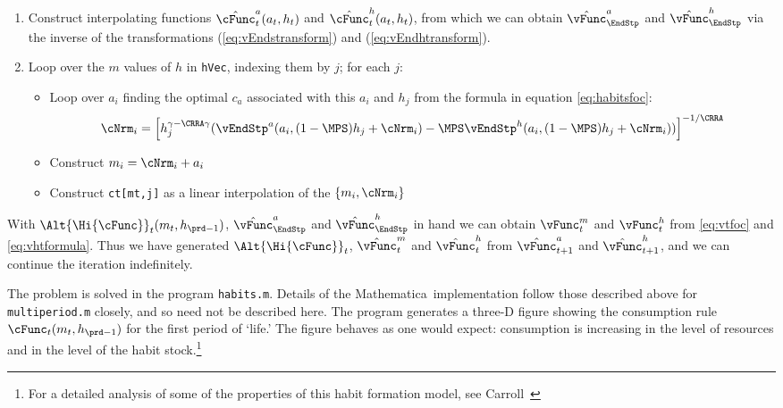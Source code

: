 \documentclass[\econtexRoot/SolvingMicroDSOPs]{subfiles}
\begin{document}
\begin{enumerate}
\item Construct interpolating functions $\hat{\cFunc}^{a}_{t}(a_{t},h_{t})$
  and $\hat{\cFunc }^{h}_{t}(a_{t},h_{t})$, from which we can
  obtain $\hat{\vFunc}_{\EndStp}^{a}$ and $\hat{\vFunc}_{\EndStp}^{h}$
  via the inverse of the transformations (\ref{eq:vEndstransform})
  and (\ref{eq:vEndhtransform}).

\item Loop over the $m$ values of $h$ in \texttt{hVec}, indexing them
  by $j$; for each $j$:
  \begin{itemize}
  \item Loop over $a_{i}$ finding the optimal $c_{a}$ associated
    with this $a_{i}$ and $h_{j}$ from the formula in equation
    \eqref{eq:habitsfoc}:
    \begin{equation}
      {\cNrm}_{i} = \left[h_{j}^{\gamma-\CRRA \gamma}
        (\vEndStp^{a}(a_{i},(1-\MPS) h_{j}+ {\cNrm}_{i})
        -\MPS \vEndStp^{h}(a_{i},(1-\MPS)
        h_{j}+{\cNrm}_{i}))\right]^{-1/\CRRA} \nonumber
    \end{equation}

  \item Construct $m_{i} = {\cNrm}_{i}+{a}_{i}$

  \item Construct \texttt{ct[mt,j]} as a linear interpolation of the
    $\{{m}_{i},{\cNrm}_{i}\}$
  \end{itemize}
\end{enumerate}

With $\Alt{\Hi{\cFunc}}_{t}(m_{t},h_{\prd-1})$, $\hat{\vFunc}_{\EndStp}^{a}$
and $\hat{\vFunc}_{\EndStp}^{h}$ in hand we can obtain $\vFunc^{m}_{t}$
and $\vFunc^{h}_{t}$ from \eqref{eq:vtfoc} and
\eqref{eq:vhtformula}. Thus we have generated $\Alt{\Hi{\cFunc}}_{t}$,
$\hat{\vFunc}^{m}_{t}$ and $\hat{\vFunc}^{h}_{t}$ from $\hat{\vFunc}^{a}_{t+1}$ and
$\hat{\vFunc}^{h}_{t+1}$, and we can continue the iteration indefinitely.

The problem is solved in the program \texttt{habits.m}.  Details of
the {Mathematica}~implementation follow those described above for
\texttt{multiperiod.m} closely, and so need not be described here.
The program generates a three-D figure showing the consumption rule
$\cFunc_{t}(m_{t},h_{\prd-1})$ for the first period of `life.'  The figure
behaves as one would expect: consumption is increasing in the level
of resources and in the level of the habit stock.\footnote{For a
  detailed analysis of some of the properties of this habit formation
  model, see Carroll~\citeyearpar{carroll:RiskyHabits}}


\end{document}
